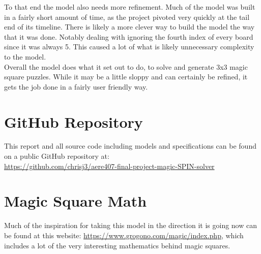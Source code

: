 \documentclass[a4paper]{article}
\begin{document}
To that end the model also needs more refinement. Much of the model was built in a fairly short amount of time, as the project pivoted very quickly at the tail end of its timeline. There is likely a more clever way to build the model the way that it was done. Notably dealing with ignoring the fourth index of every board since it was always 5. This caused a lot of what is likely unnecessary complexity to the model. \\

Overall the model does what it set out to do, to solve and generate 3x3 magic square puzzles. While it may be a little sloppy and can certainly be refined, it gets the job done in a fairly user friendly way.

\newpage

\appendix
\section{GitHub Repository}
This report and all source code including models and specifications can be found on a public GitHub repository at:\\ \url{https://github.com/chrisj3/aere407-final-project-magic-SPIN-solver}

\section{Magic Square Math}
Much of the inspiration for taking this model in the direction it is going now can be found at this website: \url{https://www.grogono.com/magic/index.php}, which includes a lot of the very interesting mathematics behind magic squares.
\end{document}
